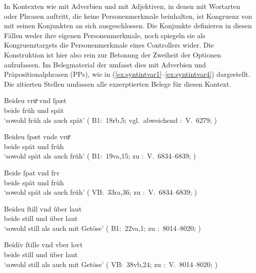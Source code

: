In Kontexten wie  mit Adverbien und
 mit Adjektiven, in denen  mit Wortarten oder Phrasen auftritt, die keine
Personenmerkmale beinhalten, ist Kongruenz von 
mit seinen Konjunkten an sich ausgeschlossen. Die Konjunkte definieren in
diesen Fällen weder ihre eigenen Personen\-merkmale, noch spiegeln sie als
Kongruenztargets die Personenmerkmale eines Controllers\is{Controller} wider.
Die Konstruktion ist hier also rein zur Betonung der Zweiheit der Optionen
aufzufassen. Im Belegmaterial der \KC{} umfasst dies 
mit Adverbien\is{Adverb} und Präpositionalphrasen (PPs), wie in
(\ref{ex:syntintvar1}--\ref{ex:syntintvar4}) dargestellt. Die zitierten Stellen
umfassen alle exzerptierten Belege für diesen Kontext.

\begin{exe}
\ex \label{ex:syntintvar1}
	\begin{xlist}
	\ex \gll Beideu vruͦ vnd ſpæt \\
		beide früh und spät \\
		\trans `sowohl früh als auch spät'
		(%
			B1:~18rb,5; vgl.~abweichend
			\KC:~V.~6279;
			\cite[196]{schroeder1895}%
		)

	\ex \gll Beideu ſpæt vnde vruͦ \\
		beide spät und früh \\
		\trans `sowohl spät als auch früh'
		(%
			B1:~19va,15; zu
			\KC:~V.~6834--6839;
			\cite[206]{schroeder1895}%
		)

	\ex \label{ex:syntintvar1_3}
	\gll Beide ſpat vnd frv \\
		beide spät und früh \\
		\trans `sowohl spät als auch früh'
			(%
				VB:~33ra,36; zu
				\KC:~V.~6834--6839;
				\cite[206]{schroeder1895}%
			)
\end{xlist}

\ex \label{ex:syntintvar3}
	\begin{xlist}
	\ex \gll Beideu ſtill vnd ûber laut \\
		beide still und über laut \\
		\trans `sowohl still als auch mit Getöse'
			(%
				B1:~22va,1; zu
				\KC:~8014--8020;
				\cite[228]{schroeder1895}%
			)

	\ex \label{ex:syntintvar3_2}
		\gll Beídív ſtille vnd vber lovt \\
		beide still und über laut \\
		\trans `sowohl still als auch mit Getöse'
			(%
				VB:~38vb,24; zu
				\KC:~V.~8014--8020;
				\cite[228]{schroeder1895}%
			)
\end{xlist}
\end{exe}

